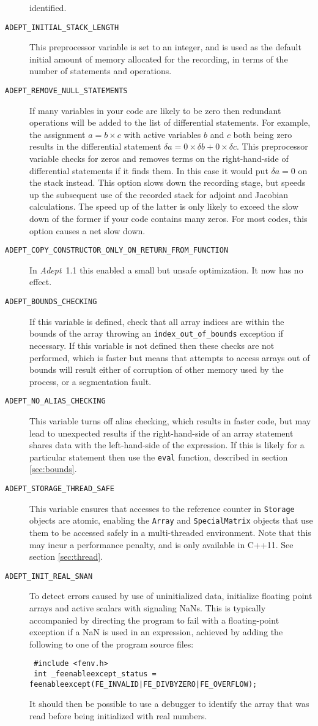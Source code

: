 \documentclass[a4,oneside]{book}
\def\codesize{\small}
\def\Adept{\emph{Adept}}
\def\code#1{{\codesize\texttt{#1}}}
\def\citem#1{\item[{\codesize\texttt{#1}}]}
\begin{document}
\begin{description}
identified.
%
\citem{ADEPT\_INITIAL\_STACK\_LENGTH} This preprocessor variable is
set to an integer, and is used as the default initial amount of memory
allocated for the recording, in terms of the number of statements and
operations.
%
\citem{ADEPT\_REMOVE\_NULL\_STATEMENTS} If many variables in your code
are likely to be zero then redundant operations will be added to the
list of differential statements. For example, the assignment
$a=b\times c$ with active variables $b$ and $c$ both being zero
results in the differential statement $\delta a=0\times\delta
b+0\times\delta c$. This preprocessor variable checks for zeros and
removes terms on the right-hand-side of differential statements if it
finds them. In this case it would put $\delta a=0$ on the stack
instead. This option slows down the recording stage, but speeds up the
subsequent use of the recorded stack for adjoint and Jacobian
calculations. The speed up of the latter is only likely to exceed the
slow down of the former if your code contains many zeros. For most
codes, this option causes a net slow down.
%
\citem{ADEPT\_COPY\_CONSTRUCTOR\_ONLY\_ON\_RETURN\_FROM\_FUNCTION} In
\Adept\ 1.1 this enabled a small but unsafe optimization. It now has
no effect.
%
\citem{ADEPT\_BOUNDS\_CHECKING} If this variable is defined, check
that all array indices are within the bounds of the array throwing an
\code{index\_out\_of\_bounds} exception if necessary.  If this
variable is not defined then these checks are not performed, which is
faster but means that attempts to access arrays out of bounds will
result either of corruption of other memory used by the process, or a
segmentation fault. 
\citem{ADEPT\_NO\_ALIAS\_CHECKING} This variable turns off alias
checking, which results in faster code, but may lead to unexpected
results if the right-hand-side of an array statement shares data with
the left-hand-side of the expression. If this is likely for a
particular statement then use the \code{eval} function, described in
section \ref{sec:bounds}.
\citem{ADEPT\_STORAGE\_THREAD\_SAFE} This variable ensures that
accesses to the reference counter in \code{Storage} objects are
atomic, enabling the \code{Array} and \code{SpecialMatrix} objects
that use them to be accessed safely in a multi-threaded
environment. Note that this may incur a performance penalty, and is
only available in C++11. See section \ref{sec:thread}.
\citem{ADEPT\_INIT\_REAL\_SNAN} To detect errors caused by use of
uninitialized data, initialize floating point arrays and active
scalars with signaling NaNs.  This is typically accompanied by
directing the program to fail with a floating-point exception if a NaN
is used in an expression, achieved by adding the following to one of
the program source files:
\begin{lstlisting}
 #include <fenv.h>
 int _feenableexcept_status = feenableexcept(FE_INVALID|FE_DIVBYZERO|FE_OVERFLOW);
\end{lstlisting}
It should then be possible to use a debugger to identify the array
that was read before being initialized with real numbers.
\end{description}
\end{document}
